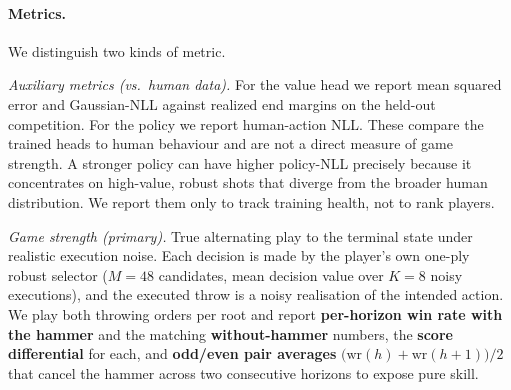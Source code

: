 \documentclass[11pt]{article}
\begin{document}
\paragraph{Metrics.}
We distinguish two kinds of metric.

\emph{Auxiliary metrics (vs.\ human data).} For the value head we report
mean squared error and Gaussian-NLL against realized end margins on the
held-out competition. For the policy we report human-action NLL. These
compare the trained heads to human behaviour and are not a direct measure
of game strength. A stronger policy can have higher policy-NLL precisely
because it concentrates on high-value, robust shots that diverge from the
broader human distribution. We report them only to track training health,
not to rank players.

\emph{Game strength (primary).} True alternating play to the terminal state
under realistic execution noise. Each decision is made by the player's own
one-ply robust selector ($M=48$ candidates, mean decision value over $K=8$
noisy executions), and the executed throw is a noisy realisation of the
intended action. We play both throwing orders per root and report
\textbf{per-horizon win rate with the hammer} and the matching
\textbf{without-hammer} numbers, the \textbf{score differential} for each,
and \textbf{odd/even pair averages}
$\big(\!\!\text{wr}(h)\!+\text{wr}(h{+}1)\big)/2$ that cancel the hammer
across two consecutive horizons to expose pure skill.
\end{document}

